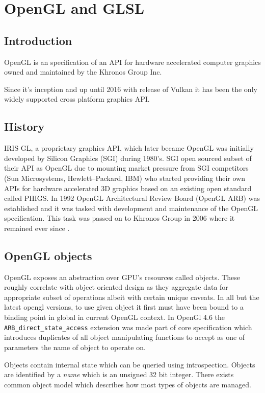 \chapter{OpenGL and GLSL}

\section{Introduction}

OpenGL is an specification of an API for hardware accelerated computer graphics owned and maintained by the Khronos Group Inc.

Since it's inception  and up until 2016 with release of Vulkan it has been the only widely supported cross platform graphics API.

\section{History}

IRIS GL, a proprietary graphics API, which later became OpenGL was initially developed by Silicon Graphics (SGI) 
during 1980's. SGI open sourced subset of their API as OpenGL due to mounting market pressure from SGI competitors (Sun Microsystems, Hewlett--Packard, IBM) 
who started providing their own APIs for hardware accelerated 3D graphics based on an existing open standard called PHIGS.
In 1992 OpenGL Architectural Review Board (OpenGL ARB) was established and it was tasked with development and maintenance of the OpenGL specification. 
This task was passed on to Khronos Group in 2006 where it remained ever since \cite{irisglwiki} \cite{glwikip}.

\section{OpenGL objects}

OpenGL exposes an abstraction over GPU's resources called objects.
These roughly correlate with object oriented design as they aggregate data for appropriate subset of operations albeit with certain unique caveats.
In all but the latest opengl versions, to use given object it first must have been bound to a binding point in global in current OpenGL context.
In OpenGl 4.6 the \texttt{ARB\_direct\_state\_access} extension was made part of core specification which introduces duplicates of all object manipulating functions to 
accept as one of parameters the name of object to operate on.

Objects contain internal state which can be queried using introspection. 
Objects are identified by a \textit{name} which is an unsigned 32 bit integer. 
There exists common object model which describes how most types of objects are managed.

